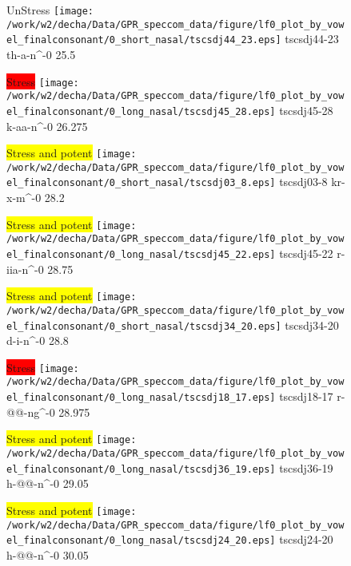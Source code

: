 \documentclass{article}
\begin{document}
\begin{figure}[t]
\begin{minipage}[b]{.24\textwidth}
UnStress
\centering
\texttt{[image: /work/w2/decha/Data/GPR\_speccom\_data/figure/lf0\_plot\_by\_vowel\_finalconsonant/0\_short\_nasal/tscsdj44\_23.eps]}
tscsdj44-23 th-a-n\textasciicircum-0 25.5
\end{minipage}
\begin{minipage}[b]{.24\textwidth}
\colorbox{red}{Stress}
\centering
\texttt{[image: /work/w2/decha/Data/GPR\_speccom\_data/figure/lf0\_plot\_by\_vowel\_finalconsonant/0\_long\_nasal/tscsdj45\_28.eps]}
tscsdj45-28 k-aa-n\textasciicircum-0 26.275
\end{minipage}
\begin{minipage}[b]{.24\textwidth}
\colorbox{yellow}{Stress and potent}
\centering
\texttt{[image: /work/w2/decha/Data/GPR\_speccom\_data/figure/lf0\_plot\_by\_vowel\_finalconsonant/0\_short\_nasal/tscsdj03\_8.eps]}
tscsdj03-8 kr-x-m\textasciicircum-0 28.2
\end{minipage}
\begin{minipage}[b]{.24\textwidth}
\colorbox{yellow}{Stress and potent}
\centering
\texttt{[image: /work/w2/decha/Data/GPR\_speccom\_data/figure/lf0\_plot\_by\_vowel\_finalconsonant/0\_long\_nasal/tscsdj45\_22.eps]}
tscsdj45-22 r-iia-n\textasciicircum-0 28.75
\end{minipage}
\end{figure}
\clearpage
\begin{figure}[t]
\begin{minipage}[b]{.24\textwidth}
\colorbox{yellow}{Stress and potent}
\centering
\texttt{[image: /work/w2/decha/Data/GPR\_speccom\_data/figure/lf0\_plot\_by\_vowel\_finalconsonant/0\_short\_nasal/tscsdj34\_20.eps]}
tscsdj34-20 d-i-n\textasciicircum-0 28.8
\end{minipage}
\begin{minipage}[b]{.24\textwidth}
\colorbox{red}{Stress}
\centering
\texttt{[image: /work/w2/decha/Data/GPR\_speccom\_data/figure/lf0\_plot\_by\_vowel\_finalconsonant/0\_long\_nasal/tscsdj18\_17.eps]}
tscsdj18-17 r-@@-ng\textasciicircum-0 28.975
\end{minipage}
\begin{minipage}[b]{.24\textwidth}
\colorbox{yellow}{Stress and potent}
\centering
\texttt{[image: /work/w2/decha/Data/GPR\_speccom\_data/figure/lf0\_plot\_by\_vowel\_finalconsonant/0\_long\_nasal/tscsdj36\_19.eps]}
tscsdj36-19 h-@@-n\textasciicircum-0 29.05
\end{minipage}
\begin{minipage}[b]{.24\textwidth}
\colorbox{yellow}{Stress and potent}
\centering
\texttt{[image: /work/w2/decha/Data/GPR\_speccom\_data/figure/lf0\_plot\_by\_vowel\_finalconsonant/0\_long\_nasal/tscsdj24\_20.eps]}
tscsdj24-20 h-@@-n\textasciicircum-0 30.05
\end{minipage}
\end{figure}
\end{document}
